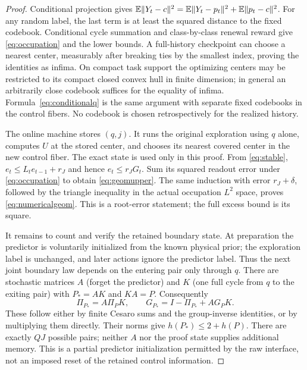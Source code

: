 \begin{proof}
Conditional projection gives
$\mathbb E\lVert Y_t-c\rVert^2=\mathbb E\lVert Y_t-p_t\rVert^2+\mathbb E\lVert p_t-c\rVert^2$.
For any random label, the last term is at least the squared distance to the fixed codebook. Conditional cycle summation and class-by-class renewal reward give \eqref{eq:occupation} and the lower bounds. A full-history checkpoint can choose a nearest center, measurably after breaking ties by the smallest index, proving the identities as infima. On compact task support the optimizing centers may be restricted to its compact closed convex hull in finite dimension; in general an arbitrarily close codebook suffices for the equality of infima. Formula~\eqref{eq:conditionalq} is the same argument with separate fixed codebooks in the control fibers. No codebook is chosen retrospectively for the realized history.

The online machine stores $(q,j)$. It runs the original exploration using $q$ alone, computes $U$ at the stored center, and chooses its nearest covered center in the new control fiber. The exact state is used only in this proof. From \eqref{eq:stable}, $e_t\le L_te_{t-1}+r_J$ and hence $e_t\le r_JG_t$. Sum its squared readout error under \eqref{eq:occupation} to obtain \eqref{eq:geomupper}. The same induction with error $r_J+\delta$, followed by the triangle inequality in the actual occupation $L^2$ space, proves \eqref{eq:numericalgeom}. This is a root-error statement; the full excess bound is its square.

It remains to count and verify the retained boundary state. At preparation the predictor is voluntarily initialized from the known physical prior; the exploration label is unchanged, and later actions ignore the predictor label. Thus the next joint boundary law depends on the entering pair only through $q$. There are stochastic matrices $A$ (forget the predictor) and $K$ (one full cycle from $q$ to the exiting pair) with $P_*=AK$ and $KA=P$. Consequently
\[
 \Pi_{P_*}=A\Pi_PK,\qquad
 G_{P_*}=I-\Pi_{P_*}+AG_PK.
\]
These follow either by finite Cesaro sums and the group-inverse identities, or by multiplying them directly. Their norms give $h(P_*)\le2+h(P)$. There are exactly $QJ$ possible pairs; neither $A$ nor the proof state supplies additional memory. This is a partial predictor initialization permitted by the raw interface, not an imposed reset of the retained control information.
\end{proof}

